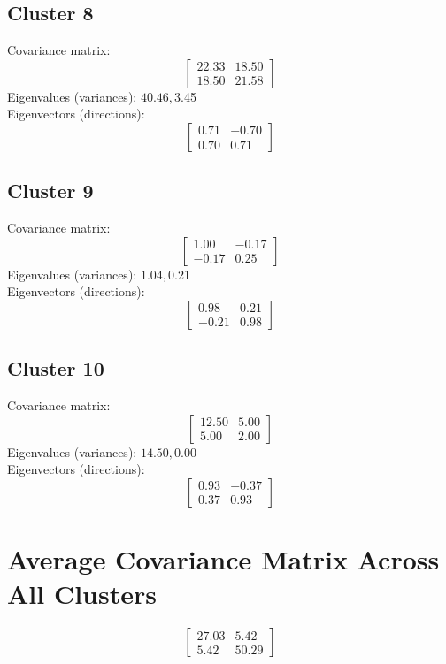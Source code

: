 \documentclass{article}
\begin{document}
\subsection*{Cluster 8}
Covariance matrix:
\[\begin{bmatrix}22.33 & 18.50 \\18.50 & 21.58\end{bmatrix}\]
Eigenvalues (variances): $ 40.46, $3.45\\
Eigenvectors (directions):
\[\begin{bmatrix}0.71 & -0.70 \\0.70 & 0.71\end{bmatrix}\]
\subsection*{Cluster 9}
Covariance matrix:
\[\begin{bmatrix}1.00 & -0.17 \\-0.17 & 0.25\end{bmatrix}\]
Eigenvalues (variances): $ 1.04, $0.21\\
Eigenvectors (directions):
\[\begin{bmatrix}0.98 & 0.21 \\-0.21 & 0.98\end{bmatrix}\]
\subsection*{Cluster 10}
Covariance matrix:
\[\begin{bmatrix}12.50 & 5.00 \\5.00 & 2.00\end{bmatrix}\]
Eigenvalues (variances): $ 14.50, $0.00\\
Eigenvectors (directions):
\[\begin{bmatrix}0.93 & -0.37 \\0.37 & 0.93\end{bmatrix}\]
\section*{Average Covariance Matrix Across All Clusters}
\[\begin{bmatrix}27.03 & 5.42 \\5.42 & 50.29\end{bmatrix}\]
\end{document}
